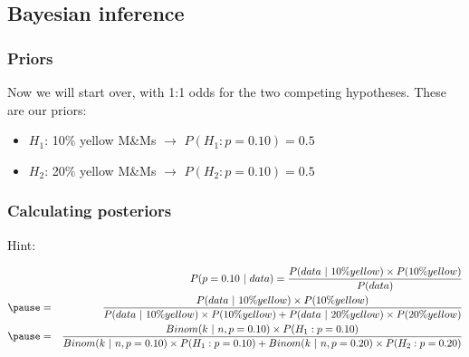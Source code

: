 \documentclass[11pt,containsverbatim,handout,xcolor=xelatex,dvipsnames,table]{beamer}
\begin{document}
\subsection{Bayesian inference}


\begin{frame}
\frametitle{Priors}

Now we will start over, with 1:1 odds for the two competing hypotheses. These are our priors:

\begin{itemize}
\item $H_1$: 10\% yellow M\&Ms $\rightarrow$ $P(H_1: p = 0.10) = 0.5$
\item $H_2$: 20\% yellow M\&Ms $\rightarrow$ $P(H_2: p = 0.10) = 0.5$
\end{itemize}

\end{frame}


\begin{frame}
\frametitle{Calculating posteriors}


\pause

\vfill

Hint:
\begin{adjustwidth}{-1in}{-1in}
{\scriptsize
\begin{eqnarray*}
&&P(p = 0.10~|~data) = \frac{P(data~|~10\% yellow) \times P(10\% yellow)}{P(data)} \\
\pause
&=& \frac{P(data~|~10\% yellow) \times P(10\% yellow)}{P(data~|~10\% yellow) \times P(10\% yellow) + P(data~|~20\% yellow) \times P(20\% yellow)} \\
\pause
&=& \frac{Binom(k~|~n, p = 0.10) \times P(H_1: p = 0.10)}{Binom(k~|~n, p = 0.10) \times P(H_1: p = 0.10) + Binom(k~|~n, p = 0.20) \times P(H_2: p = 0.20)} 
\end{eqnarray*}
}

\end{adjustwidth}

\end{frame}
\end{document}
